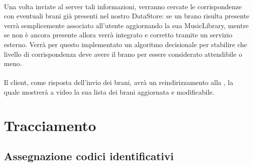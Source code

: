 \\
Una volta inviate al server tali informazioni, verranno cercate le
corrispondenze con eventuali brani gi\`a presenti nel nostro DataStore: se un
brano risulta presente verr\`a semplicemente associato all'utente aggiornando la
sua MusicLibrary, mentre se non \`e ancora presente allora verr\`a integrato e
corretto tramite un servizio esterno. Verr\`a per questo implementato un algoritmo
decisionale per stabilire che livello di corrispondenza deve avere il brano per
essere considerato attendibile o meno.\\
\\
Il client, come risposta dell'invio dei brani, avr\`a un reindirizzamento alla
, la quale mostrer\`a a video la sua lista dei brani
aggiornata e modificabile.

\chapter{Tracciamento}
\thispagestyle{fancy}
\section{Assegnazione codici identificativi}

